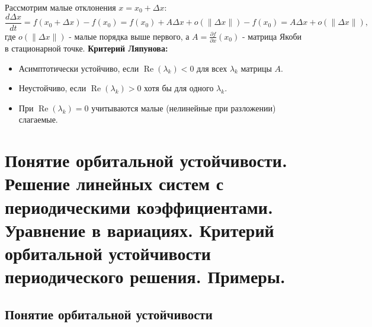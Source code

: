 	Рассмотрим малые отклонения \(x = x_0 + \Delta x\):
	\begin{equation}
		\frac{d \Delta x}{d t} = f(x_0 + \Delta x) - f(x_0) = f(x_0) + A \Delta x + o(\|\Delta x\|) - f(x_0) = A \Delta x + o(\|\Delta x\|),
	\end{equation}
	где \(o(\|\Delta x\|)\) - малые порядка выше первого, а \(A = \frac{\partial f}{\partial x}(x_0)\) - матрица Якоби в стационарной точке.
	\vspace{0.5em}
	\newline
	\textbf{Критерий Ляпунова:}
	\begin{itemize}
		\item Асимптотически устойчиво, если \(\operatorname{Re}(\lambda_k) < 0\) для всех \(\lambda_k\) матрицы \(A\).
		\item Неустойчиво, если \(\operatorname{Re}(\lambda_k) > 0\) хотя бы для одного \(\lambda_k\).
		\item При \(\operatorname{Re}(\lambda_k) = 0\) учитываются малые (нелинейные при разложении) слагаемые.
	\end{itemize}
	
	\newpage
	
	\section{Понятие орбитальной устойчивости. Решение линейных систем с периодическими коэффициентами. Уравнение в вариациях. Критерий орбитальной устойчивости периодического решения. Примеры.}
	
	\subsection{Понятие орбитальной устойчивости}
	
